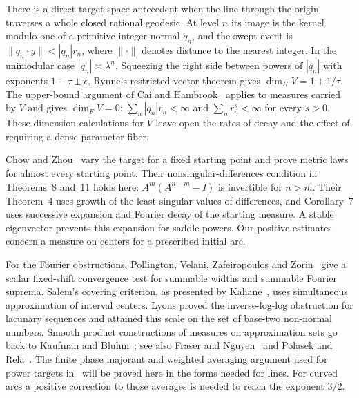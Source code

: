 \documentclass[11pt,a4paper,reqno]{amsart}
\theoremstyle{definition}
\theoremstyle{remark}
\numberwithin{equation}{section}
\begin{document}
There is a direct target-space antecedent when the line through the origin
traverses a whole closed rational geodesic. At level \(n\) its image is the
kernel modulo one of a primitive integer normal \(q_n\), and the swept
event is \(\|q_n\cdot y\|<|q_n|r_n\), where \(\|\cdot\|\) denotes distance
to the nearest integer. In the unimodular case \(|q_n|\asymp\lambda^n\).
Squeezing the right side between powers of \(|q_n|\) with exponents
\(1-\tau\pm\epsilon\), Rynne's restricted-vector theorem
\cite[p.~70]{Rynne} gives \(\dim_H V=1+1/\tau\). The upper-bound
argument of Cai and Hambrook~\cite[Theorem~1.4.1 and \S3.3]{CH}
applies to measures carried by \(V\) and gives \(\dim_F V=0\):
\(\sum_n |q_n|r_n<\infty\) and \(\sum_n r_n^s<\infty\) for every \(s>0\).
These dimension calculations for \(V\) leave open the rates of decay and
the effect of requiring a dense parameter fiber.

Chow and Zhou~\cite[Theorems~4, 8, 11 and Corollary~7]{CZ} vary the
target for a fixed starting point and prove metric laws for almost every
starting point. Their nonsingular-differences condition in Theorems~8
and~11 holds here: \(A^m(A^{n-m}-I)\) is invertible for \(n>m\).
Their Theorem~4 uses growth of the least singular values of differences,
and Corollary~7 uses successive expansion and Fourier decay of the
starting measure. A stable eigenvector prevents this expansion for saddle
powers. Our positive estimates concern a measure on centers for a
prescribed initial arc.

For the Fourier obstructions, Pollington, Velani, Zafeiropoulos and
Zorin~\cite[Theorem~2]{PVZZ} give a scalar fixed-shift convergence test
for summable widths and summable Fourier suprema. Salem's covering
criterion, as presented by Kahane~\cite[Ch.~VII, \S8, p.~97]{Kahane},
uses simultaneous approximation of interval centers. Lyons
\cite[Theorems~4--5, p.~608, and Lemma~9, pp.~613--614]{Lyons}
proved the inverse-log-log obstruction for lacunary sequences and
attained this scale on the set of base-two non-normal numbers.
Smooth product constructions of measures on approximation sets
go back to Kaufman and Bluhm~\cite{Kaufman,Bluhm}; see also
Fraser and Nguyen~\cite{FN} and Polasek and Rela~\cite{PR}.
The finite phase majorant and weighted averaging argument used for power
targets in~\cite{Power} will be proved here in the forms needed for lines.
For curved arcs a positive correction to those averages is needed to
reach the exponent \(3/2\).
\end{document}

